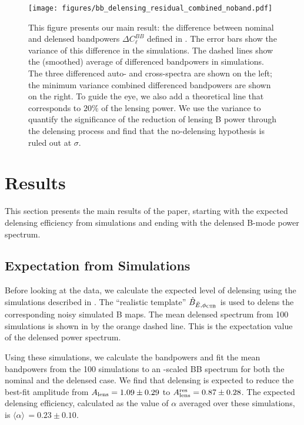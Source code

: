 \begin{figure*}
\begin{center}
\texttt{[image: figures/bb\_delensing\_residual\_combined\_noband.pdf]}
\caption{This figure presents our main result: the difference between nominal and delensed bandpowers $\Delta C_{\ell}^{BB}$ defined in .
The error bars show the variance of this difference in the simulations.
The dashed lines show the (smoothed) average of differenced bandpowers in simulations.
The three differenced auto- and cross-spectra are shown on the left; the minimum variance combined differenced bandpowers are shown on the right.
To guide the eye, we also add a theoretical line that corresponds to $20\%$ of the lensing power.
We use the variance to quantify the significance of the reduction of lensing B power through the delensing process and find that the no-delensing hypothesis is ruled out at \delSignificance$\sigma$.
}
\label{fig:delta_cl}
\end{center}
\end{figure*}

\section{Results}
\label{sec:res}

This section presents the main results of the paper, starting with the expected delensing efficiency from simulations and ending with the delensed \sptpol B-mode power spectrum.

\subsection{Expectation from Simulations}
\label{sec:res-sim}
Before looking at the data, we calculate the expected level of delensing using the simulations described in .
The ``realistic template'' $\hat{B}_{\bar{E}, \phi_{\rm CIB}}$ is used to delens the corresponding noisy simulated B maps.
The mean delensed spectrum from 100 simulations is shown in  by the orange dashed line.
This is the expectation value of the delensed power spectrum.

Using these simulations,
we calculate the bandpowers and fit the mean bandpowers from the 100 simulations to an \Alens-scaled BB spectrum
for both the nominal and the delensed case.
We find that delensing is expected to reduce the best-fit amplitude from $A_{\rm lens} = 1.09 \pm 0.29$ to $A^{\rm res}_{\rm lens} = 0.87 \pm 0.28$.
The expected delensing efficiency, calculated as the value of $\alpha$ averaged over these simulations, is $\langle \alpha \rangle\, = 0.23 \pm 0.10$.

